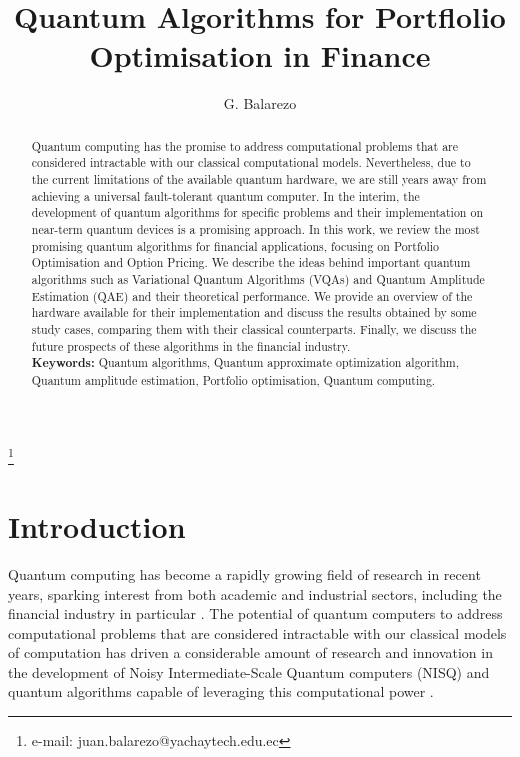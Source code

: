 \documentclass[prx,twocolumn,floatfix,superscriptaddress,longbibliography]{revtex4-1}
\begin{document}
\title{Quantum Algorithms for Portflolio Optimisation in Finance}

\author{G. Balarezo}
\thanks{e-mail: juan.balarezo@yachaytech.edu.ec}


\begin{abstract}
Quantum computing has the promise to address computational problems that are considered intractable with our classical computational models. Nevertheless, due to the current limitations of the available quantum hardware, we are still years away from achieving a universal fault-tolerant quantum computer. In the interim, the development of quantum algorithms for specific problems and their implementation on near-term quantum devices is a promising approach. In this work, we review the most promising quantum algorithms for financial applications, focusing on Portfolio Optimisation and Option Pricing. We describe the ideas behind important quantum algorithms such as Variational Quantum Algorithms (VQAs) and Quantum Amplitude Estimation (QAE) and their theoretical performance. We provide an overview of the hardware available for their implementation and discuss the results 
obtained by some study cases, comparing them with their classical counterparts. Finally, we discuss the future prospects of these algorithms in the financial industry.
  \\
  \textbf{Keywords:} Quantum algorithms, Quantum approximate optimization algorithm, Quantum amplitude estimation, Portfolio optimisation, Quantum computing.
\end{abstract}

\maketitle

\section{Introduction}

Quantum computing has become a rapidly growing field of research in recent years, sparking interest from both academic and industrial sectors, including the financial industry in particular \cite{Hassija2020}. The potential of quantum computers to address computational problems that are considered intractable with our classical models of computation \cite{nielsen2010quantum} has driven a considerable amount of research and innovation in the development of Noisy Intermediate-Scale Quantum computers (NISQ) and quantum algorithms capable of leveraging this computational power \cite{Huang2023}. 
\end{document}

